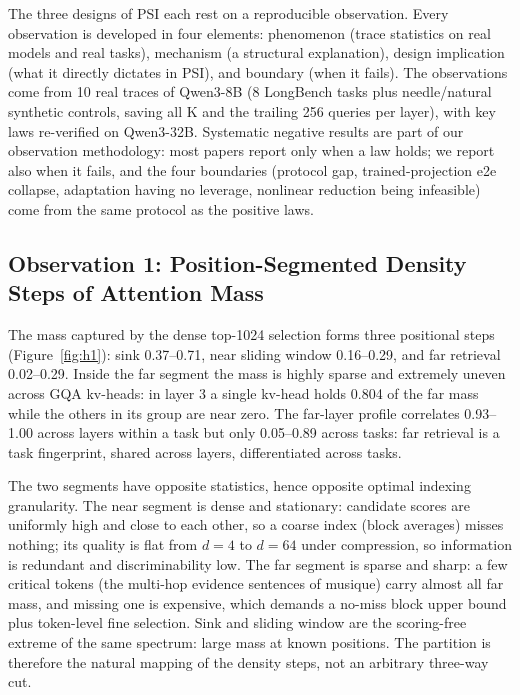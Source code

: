 \documentclass[11pt]{article}
\begin{document}
The three designs of PSI each rest on a reproducible observation. Every observation is developed in four elements: phenomenon (trace statistics on real models and real tasks), mechanism (a structural explanation), design implication (what it directly dictates in PSI), and boundary (when it fails). The observations come from 10 real traces of Qwen3-8B (8 LongBench tasks plus needle/natural synthetic controls, saving all K and the trailing 256 queries per layer), with key laws re-verified on Qwen3-32B. Systematic negative results are part of our observation methodology: most papers report only when a law holds; we report also when it fails, and the four boundaries (protocol gap, trained-projection e2e collapse, adaptation having no leverage, nonlinear reduction being infeasible) come from the same protocol as the positive laws.

\subsection{Observation 1: Position-Segmented Density Steps of Attention Mass}\label{sec:obsa}

The mass captured by the dense top-1024 selection forms three positional steps (Figure~\ref{fig:h1}): sink 0.37--0.71, near sliding window 0.16--0.29, and far retrieval 0.02--0.29. Inside the far segment the mass is highly sparse and extremely uneven across GQA kv-heads: in layer 3 a single kv-head holds 0.804 of the far mass while the others in its group are near zero. The far-layer profile correlates 0.93--1.00 across layers within a task but only 0.05--0.89 across tasks: far retrieval is a task fingerprint, shared across layers, differentiated across tasks.

The two segments have opposite statistics, hence opposite optimal indexing granularity. The near segment is dense and stationary: candidate scores are uniformly high and close to each other, so a coarse index (block averages) misses nothing; its quality is flat from $d{=}4$ to $d{=}64$ under compression, so information is redundant and discriminability low. The far segment is sparse and sharp: a few critical tokens (the multi-hop evidence sentences of musique) carry almost all far mass, and missing one is expensive, which demands a no-miss block upper bound plus token-level fine selection. Sink and sliding window are the scoring-free extreme of the same spectrum: large mass at known positions. The partition is therefore the natural mapping of the density steps, not an arbitrary three-way cut.
\end{document}

